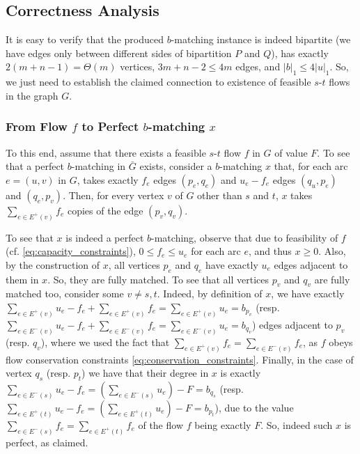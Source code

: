 \documentclass[11pt, letterpaper]{article}
\newcommand{\onorm}[1]{|#1|_{1}}
\newcommand{\oG}{\bar{G}}
\newcommand{\bb}{\boldsymbol{\mathit{b}}}
\newcommand{\ff}{\boldsymbol{\mathit{f}}}
\newcommand{\uu}{\boldsymbol{\mathit{u}}}
\newcommand{\xx}{\boldsymbol{\mathit{x}}}
\begin{document}
\subsection{Correctness Analysis}

It is easy to verify that the produced $\bb$-matching instance is indeed bipartite (we have edges only between different sides of bipartition $P$ and $Q$), has exactly $2(m+n-1)=\Theta(m)$ vertices, $3m+n-2\leq 4m$ edges, and $\onorm{\bb}\leq 4\onorm{\uu}$. So, we just need to establish the claimed connection to existence of feasible $s$-$t$ flows in the graph $G$. 


\subsubsection*{From Flow $\ff$ to Perfect $\bb$-matching $\xx$}

To this end, assume that there exists a feasible $s$-$t$ flow $\ff$ in $G$ of value $F$. To see that a perfect $\bb$-matching in $\oG$ exists, consider a $\bb$-matching $\xx$ that, for each arc $e=(u,v)$ in $G$, takes exactly $f_e$ edges $(p_e,q_e)$ and $u_e-f_e$ edges $(q_u,p_e)$ and $(q_e,p_v)$. Then, for every vertex $v$ of $G$ other than $s$ and $t$, $\xx$ takes $\sum_{e\in E^+(v)} f_e$ copies of the edge $(p_v,q_v)$. 

To see that $\xx$ is indeed a perfect $\bb$-matching, observe that due to feasibility of $\ff$ (cf. \eqref{eq:capacity_constraints}),  $0\leq f_e \leq u_e$ for each arc $e$, and thus $\xx\geq 0$. Also, by the construction of $\xx$, all vertices $p_e$ and $q_e$ have exactly $u_e$ edges adjacent to them in $\xx$. So, they are fully matched. To see that all vertices $p_v$ and $q_v$ are fully matched too, consider some $v\neq s,t$. Indeed, by definition of $\xx$, we have exactly $\sum_{e\in E^+(v)} u_e-f_e+\sum_{e\in E^+(v)} f_e=\sum_{e\in E^+(v)} u_e=b_{p_v}$ (resp. $\sum_{e\in E^-(v)} u_e-f_e+\sum_{e\in E^-(v)} f_e=\sum_{e\in E^-(v)} u_e=b_{q_v}$) edges adjacent to $p_v$ (resp. $q_v$), where we used the fact that $\sum_{e\in E^+(v)} f_e=\sum_{e\in E^-(v)} f_e$, as $\ff$ obeys flow conservation constraints \eqref{eq:conservation_constraints}. Finally, in the case of vertex $q_s$ (resp. $p_t$) we have that their degree in $\xx$ is exactly $\sum_{e\in E^-(s)} u_e-f_e = (\sum_{e\in E^-(s)} u_e) - F = b_{q_s}$ (resp. $\sum_{e\in E^+(t)} u_e-f_e = (\sum_{e\in E^+(t)} u_e)- F = b_{p_t}$), due to the value $\sum_{e\in E^-(s)} f_e = \sum_{e\in E^+(t)} f_e$ of the flow $\ff$ being exactly $F$. So, indeed such $\xx$ is perfect, as claimed.
\end{document}
